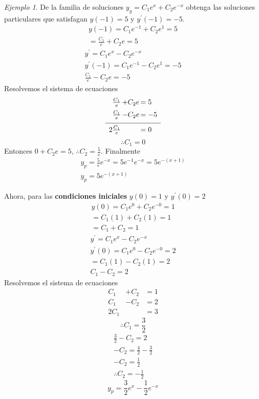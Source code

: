 \documentclass[12pt]{article} %
\theoremstyle{remark} %
\newtheorem{ejemplo}{Ejemplo}[section]
\begin{document}
\begin{ejemplo}
  De la familia de soluciones $y_g = C_1 e^x + C_2 e^{-x}$ obtenga las
  soluciones particulares que satisfagan $y(-1) = 5$ y $y^{\prime}(-1) = -5$.
  \begin{gather*}
    y(-1) = C_1 e^{-1} + C_2 e^1 = 5\\
    = \frac{C_1}{e} + C_2 e = 5
  \end{gather*}
  \begin{gather*}
    y^{\prime} = C_1 e^x - C_2 e^{-x}\\
    y^{\prime}(-1) = C_1 e^{-1} - C_2 e^1 = -5\\
    \frac{C_1}{e} - C_2 e = -5
  \end{gather*}
  Resolvemos el sistema de ecuaciones
\[
\begin{array}{r@{\,}c@{\,}l}
  \frac{C_1}{e} & + C_2 e & = 5 \\[0.5em]
  \frac{C_1}{e} & - C_2 e & = -5 \\[0.5em]
  \hline
  \rule{0pt}{1.2em}2\frac{C_1}{e} &         & = 0
\end{array}
\]
\[ \therefore C_1 = 0 \]
Entonces $0 + C_2 e = 5$, $\therefore C_2 = \frac{5}{e}$.
Finalmente
\begin{gather*}
  y_p = \frac{5}{e} e^{-x} = 5 e^{-1} e^{-x} = 5e^{-(x+1)}\\
  y_p = 5e^{-(x+1)}
\end{gather*}

Ahora, para las \textbf{condiciones iniciales} $y(0) = 1$ y $y^{\prime}(0) = 2$
\begin{gather*}
  y(0) = C_1 e^0 + C_2 e^{-0} = 1\\
  = C_1(1)+C_2(1) = 1\\
  = C_1 + C_2 = 1
\end{gather*}
\begin{gather*}
  y^{\prime} = C_1 e^x - C_2 e^{-x}\\
  y^{\prime}(0) = C_1 e^0 - C_2e^{-0} = 2\\
  = C_1(1) - C_2(1) = 2\\
  C_1 - C_2 = 2
\end{gather*}
Resolvemos el sistema de ecuaciones
\[
  \begin{array}{rcl}
    C_1 & + C_2 & = 1\\
    C_1 & - C_2 & = 2\\
    \hline
    2C_1 & & = 3
  \end{array}
\]
\[ \therefore C_1 = \frac{3}{2} \]
\begin{gather*}
  \frac{3}{2} - C_2 = 2\\
  -C_2 = \frac{4}{2} - \frac{3}{2}\\
  -C_2 = \frac{1}{2}\\
  \therefore C_2 = - \frac{1}{2}
\end{gather*}
\[ y_p = \frac{3}{2}e^x - \frac{1}{2}e^{-x} \]
\end{ejemplo}
\end{document}

